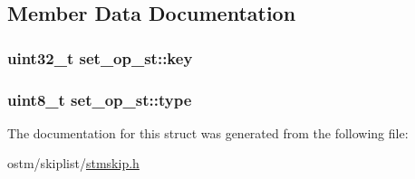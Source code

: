 \subsection{Member Data Documentation}
\hypertarget{structset__op__st_a08e9db35b667c4e179e10dc439896997}{
\subsubsection[{key}]{\setlength{\rightskip}{0pt plus 5cm}uint32\-\_\-t set\-\_\-op\-\_\-st\-::key}}\label{structset__op__st_a08e9db35b667c4e179e10dc439896997}
\hypertarget{structset__op__st_ae8e9c78593f4322e4abd3dbdc7ca93bc}{
\subsubsection[{type}]{\setlength{\rightskip}{0pt plus 5cm}uint8\-\_\-t set\-\_\-op\-\_\-st\-::type}}\label{structset__op__st_ae8e9c78593f4322e4abd3dbdc7ca93bc}


The documentation for this struct was generated from the following file\-:\begin{DoxyCompactItemize}
\item 
ostm/skiplist/\hyperlink{stmskip_8h}{stmskip.\-h}\end{DoxyCompactItemize}
